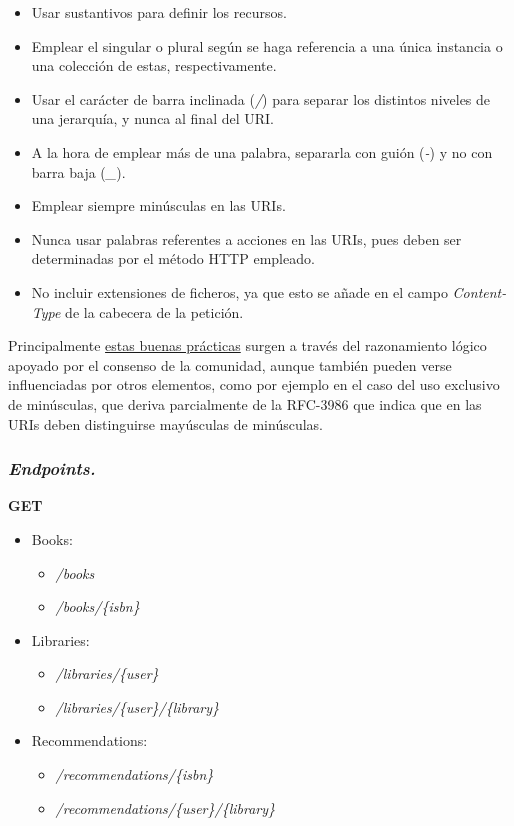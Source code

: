 \begin{itemize}
    \item Usar sustantivos para definir los recursos.
    \item Emplear el singular o plural según se haga referencia a una única instancia o una colección de estas, respectivamente.
    \item Usar el carácter de barra inclinada (\textit{/}) para separar los distintos niveles de una jerarquía, y nunca al final del URI.
    \item A la hora de emplear más de una palabra, separarla con guión (\textit{-}) y no con barra baja (\textit{\_}).
    \item Emplear siempre minúsculas en las URIs.
    \item Nunca usar palabras referentes a acciones en las URIs, pues deben ser determinadas por el método HTTP empleado.
    \item No incluir extensiones de ficheros, ya que esto se añade en el campo \textit{Content-Type} de la cabecera de la petición.
\end{itemize}

Principalmente \href{https://restfulapi.net/resource-naming/}{estas buenas prácticas} surgen a través del razonamiento lógico apoyado por el consenso de la comunidad, aunque también pueden verse influenciadas por otros elementos, como por ejemplo en el caso del uso exclusivo de minúsculas, que deriva parcialmente de la RFC-3986\cite{URIRFC} que indica que en las URIs deben distinguirse mayúsculas de minúsculas.

\subsubsection{\textit{Endpoints.}}

\textbf{GET}
\begin{itemize}
    \item Books:
    \begin{itemize}
        \item \textit{/books}
        \item \textit{/books/\{isbn\}}
    \end{itemize}
    \item Libraries:
    \begin{itemize}
        \item \textit{/libraries/\{user\}}
        \item \textit{/libraries/\{user\}/\{library\}}
    \end{itemize}
    \item Recommendations:
    \begin{itemize}
        \item \textit{/recommendations/\{isbn\}}
        \item \textit{/recommendations/\{user\}/\{library\}}
    \end{itemize}
\end{itemize}


